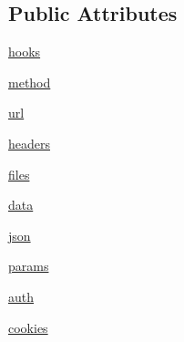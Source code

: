 \subsection*{Public Attributes}
\begin{DoxyCompactItemize}
\item 
\hyperlink{classpip_1_1__vendor_1_1requests_1_1models_1_1Request_a84e606481a29a063b2631d867ece6385}{hooks}
\item 
\hyperlink{classpip_1_1__vendor_1_1requests_1_1models_1_1Request_a1abe778109e5e62b9899212a82f35c21}{method}
\item 
\hyperlink{classpip_1_1__vendor_1_1requests_1_1models_1_1Request_a2f09fa6b6d5dc1b66f18f35c87a6a9ac}{url}
\item 
\hyperlink{classpip_1_1__vendor_1_1requests_1_1models_1_1Request_ad4046fa53a2dc5072f91e798328cdc8d}{headers}
\item 
\hyperlink{classpip_1_1__vendor_1_1requests_1_1models_1_1Request_a30545c8379b7cc31c6d2fc63d909f7fb}{files}
\item 
\hyperlink{classpip_1_1__vendor_1_1requests_1_1models_1_1Request_a6f8c20c420d2876df5ceed3b47ae7f10}{data}
\item 
\hyperlink{classpip_1_1__vendor_1_1requests_1_1models_1_1Request_af58d7221f333c2a768935c96af37c82c}{json}
\item 
\hyperlink{classpip_1_1__vendor_1_1requests_1_1models_1_1Request_af0c527889cc5ac1f6984c1e5a304a291}{params}
\item 
\hyperlink{classpip_1_1__vendor_1_1requests_1_1models_1_1Request_a1ee0c0977e654596a8a8b3ed4bf6b867}{auth}
\item 
\hyperlink{classpip_1_1__vendor_1_1requests_1_1models_1_1Request_a2469f801afbf4ffe3bc894b56e769f0a}{cookies}
\end{DoxyCompactItemize}



